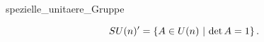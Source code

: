 \documentclass[class=article, crop=false]{standalone}
\begin{document}
\begin{zettel}{spezielle_unitaere_Gruppe}
\begin{flashcard}
\[
SU (n) '= \set{A \in  U (n)}{\det A = 1}
.\]
\end{flashcard}
\end{zettel}
\end{document}

